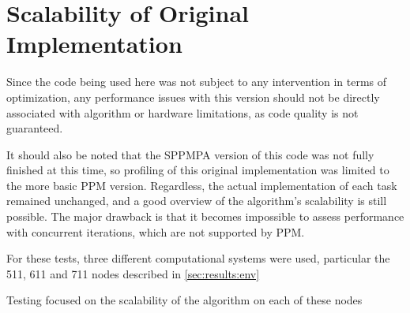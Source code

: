 \documentclass[main.tex]{subfiles}
\begin{document}
\section{Scalability of Original Implementation} \label{sec:results:original}

Since the code being used here was not subject to any intervention in terms of optimization, any performance issues with this version should not be directly associated with algorithm or hardware limitations, as code quality is not guaranteed.

It should also be noted that the SPPMPA version of this code was not fully finished at this time, so profiling of this original implementation was limited to the more basic PPM version. Regardless, the actual implementation of each task remained unchanged, and a good overview of the algorithm's scalability is still possible. The major drawback is that it becomes impossible to assess performance with concurrent iterations, which are not supported by PPM.

For these tests, three different computational systems were used, particular the 511, 611 and 711 nodes described in \cref{sec:results:env}

Testing focused on the scalability of the algorithm on each of these nodes

\end{document}
